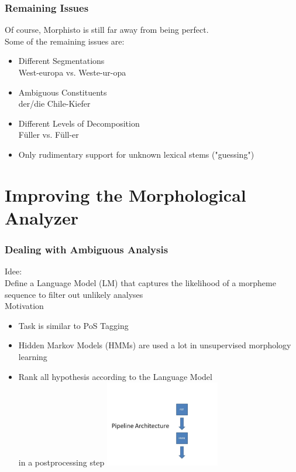\documentclass {beamer}
\begin{document}
\frame
{  
\frametitle{Remaining Issues}
Of course, Morphisto is still far away from being perfect. \\
Some of the remaining issues are:  
\begin{itemize}
  \item<1-> Different Segmentations \\
   West-europa vs. Weste-ur-opa 
  \item<2-> Ambiguous Constituents \\
   der/die Chile-Kiefer 
  \item<3-> Different Levels of Decomposition \\
     F\"uller vs. F\"ull-er \\
  \item<4-> Only rudimentary support for unknown lexical stems ("guessing")
\end{itemize}
}


\section{Improving the Morphological Analyzer}

\frame
{  \frametitle{Dealing with Ambiguous Analysis}
Idee:\\
Define a Language Model (LM) that captures the likelihood of a morpheme sequence to filter out unlikely analyses \\
Motivation
 \begin{itemize}
\item Task is similar to PoS Tagging 
\item Hidden Markov Models (HMMs) are used a lot in unsupervised morphology learning
\item Rank all hypothesis according to the Language Model \\
in a postprocessing step
\includegraphics[width=5cm] {Pipeline2.jpg}
\end{itemize}
}
 
\end{document}
